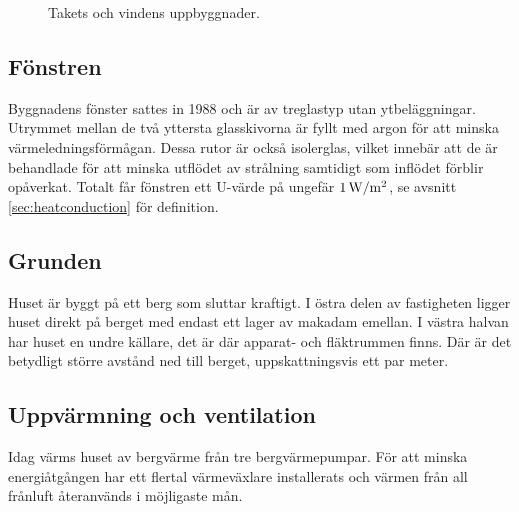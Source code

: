 \begin{figure}[hpbt]
\centering
{}
\caption{\label{fig:roof_attic} Takets och vindens uppbyggnader.}
\end{figure}


\subsection{Fönstren}

Byggnadens fönster sattes in 1988 och är av treglastyp utan ytbeläggningar. Utrymmet mellan de två yttersta glasskivorna är fyllt med argon för att minska värmeledningsförmågan. Dessa rutor är också isolerglas, vilket innebär att de är behandlade för att minska utflödet av strålning samtidigt som inflödet förblir opåverkat.  Totalt får fönstren ett U-värde på ungefär $\unit[1]{W/m^2}$, se avsnitt \ref{sec:heatconduction} för definition. 

\subsection{Grunden}

Huset är byggt på ett berg som sluttar kraftigt. I östra delen av fastigheten ligger huset direkt på berget med endast ett lager av makadam emellan\cite{petersarneo}. I västra halvan har huset en undre källare, det är där apparat- och fläktrummen finns. Där är det betydligt större avstånd ned till berget, uppskattningsvis ett par meter. %

\subsection{Uppvärmning och ventilation}
Idag värms huset av bergvärme från tre bergvärmepumpar. För att minska energiåtgången har ett flertal värmeväxlare installerats och värmen från all frånluft återanvänds i möjligaste mån.
